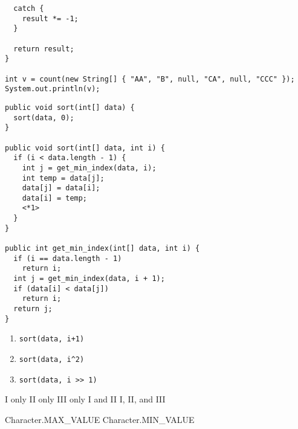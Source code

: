 \documentclass[11pt,addpoints]{exam}
\begin{document}
\begin{questions}
\begin{minipage}{\textwidth}
\begin{verbatim}
  catch {
    result *= -1;
  }

  return result;
}

int v = count(new String[] { "AA", "B", null, "CA", null, "CCC" });
System.out.println(v);
\end{verbatim}

\begin{choices}
\end{choices}
\end{minipage}

\begin{minipage}{\textwidth}
\begin{verbatim}
public void sort(int[] data) {
  sort(data, 0);
}

public void sort(int[] data, int i) {
  if (i < data.length - 1) {
    int j = get_min_index(data, i);
    int temp = data[j];
    data[j] = data[i];
    data[i] = temp;
    <*1>
  }
}

public int get_min_index(int[] data, int i) {
  if (i == data.length - 1)
    return i;
  int j = get_min_index(data, i + 1);
  if (data[i] < data[j])
    return i;
  return j;
}
\end{verbatim}


\begin{enumerate}[label=\Roman*.]
  \item {\tt sort(data, i+1)}
  \item {\tt sort(data, i\textasciicircum2)}
  \item {\tt sort(data, i >> 1)}
\end{enumerate}

\begin{choices}
  \choice I only
  \choice II only
  \choice III only
  \choice I and II
  \choice I, II, and III
\end{choices}

\end{minipage}


\begin{minipage}{\textwidth}

\begin{choices}
  \choice Character.MAX\_VALUE
  \choice Character.MIN\_VALUE
\end{choices}
\end{minipage}


\end{questions}
\end{document}
